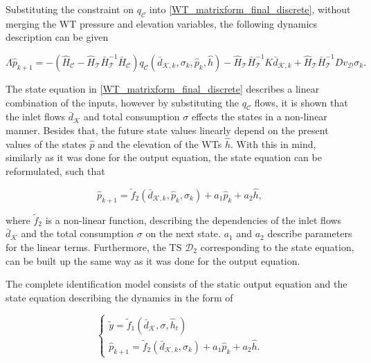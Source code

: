 Substituting the constraint on $q_{\mathcal{C}}$ into \eqref{WT_matrixform_final_discrete}, without merging the WT pressure and elevation variables, the following dynamics description can be given

\begin{equation}
\label{WT_matrixform_final_discrete1}
\Lambda \hat{p}_{k+1} = - (\hat{H}_{\mathcal{C}} - \hat{H}_{\mathcal{T}} \bar{H}^{-1}_{\mathcal{T}}\bar{H}_{\mathcal{C}})  q_\mathcal{C}(\bar{d}_{\mathcal{K},k}, \sigma_k, \hat{p}_k, \hat{h})  - \hat{H}_{\mathcal{T}} \bar{H}^{-1}_{\mathcal{T}} K \bar{d}_{\mathcal{K},k} + \hat{H}_{\mathcal{T}} \bar{H}^{-1}_{\mathcal{T}} D v_{\mathcal{D}} \sigma_k.
\end{equation}

The state equation in \eqref{WT_matrixform_final_discrete} describes a linear combination of the inputs, however by substituting the $q_\mathcal{C}$ flows, it is shown that the inlet flows $\bar{d}_{\mathcal{K}}$ and total consumption $\sigma$ effects the states in a non-linear manner. Besides that, the future state values linearly depend on the present values of the states $\hat{p}$ and the elevation of the WTs $\hat{h}$. With this in mind, similarly as it was done for the output equation, the state equation can be reformulated, such that 

\begin{equation}
\label{WT_matrixform_final_discrete2}
\hat{p}_{k+1} = \tilde{f}_2(\bar{d}_{\mathcal{K},k}, \hat{p}_k, \sigma_k) + a_1 \hat{p}_k + a_2 \hat{h},
\end{equation}

where $\tilde{f}_2$ is a non-linear function, describing the dependencies of the inlet flows $\bar{d}_{\mathcal{K}}$ and the total consumption $\sigma$ on the next state. $a_1$ and $a_2$ describe parameters for the linear terms. Furthermore, the TS $\mathcal{D}_2$ corresponding to the state equation, can be built up the same way as it was done for the output equation. 

The complete identification model consists of the static output equation and the state equation describing the dynamics in the form of

\begin{equation}
\begin{cases}
  \label{identification_model}
    \tilde{y}  = \tilde{f}_1(\bar{d}_{\mathcal{K}}, \sigma, \hat{h}_t )\\
  \hat{p}_{k+1} = \tilde{f}_2(\bar{d}_{\mathcal{K},k}, \sigma_k) + a_1 \hat{p}_k + a_2 \hat{h} .
  \end{cases}
\end{equation} 

